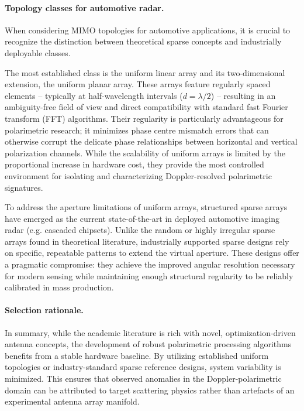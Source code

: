 \paragraph{Topology classes for automotive radar.}
When considering MIMO topologies for automotive applications, it is crucial to recognize the distinction between theoretical sparse concepts and industrially deployable classes.

The most established class is the uniform linear array and its two-dimensional extension, the uniform planar array.
These arrays feature regularly spaced elements -- typically at half-wavelength intervals ($d=\lambda/2$) -- resulting in an ambiguity-free field of view and direct compatibility with standard fast Fourier transform (FFT) algorithms.
Their regularity is particularly advantageous for polarimetric research; it minimizes phase centre mismatch errors that can otherwise corrupt the delicate phase relationships between horizontal and vertical polarization channels.
While the scalability of uniform arrays is limited by the proportional increase in hardware cost, they provide the most controlled environment for isolating and characterizing Doppler-resolved polarimetric signatures.

To address the aperture limitations of uniform arrays, structured sparse arrays have emerged as the current state-of-the-art in deployed automotive imaging radar (e.g. cascaded chipsets).
Unlike the random or highly irregular sparse arrays found in theoretical literature, industrially supported sparse designs rely on specific, repeatable patterns to extend the virtual aperture.
These designs offer a pragmatic compromise: they achieve the improved angular resolution necessary for modern sensing while maintaining enough structural regularity to be reliably calibrated in mass production.

\paragraph{Selection rationale.}
In summary, while the academic literature is rich with novel, optimization-driven antenna concepts, the development of robust polarimetric processing algorithms benefits from a stable hardware baseline.
By utilizing established uniform topologies or industry-standard sparse reference designs, system variability is minimized.
This ensures that observed anomalies in the Doppler-polarimetric domain can be attributed to target scattering physics rather than artefacts of an experimental antenna array manifold.


